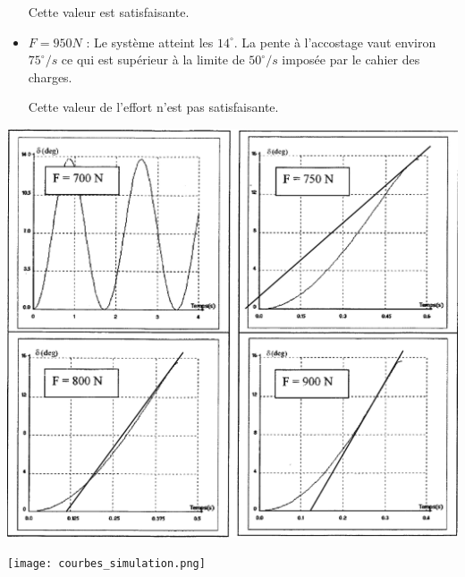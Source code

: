 \begin{multicols}{2}
\begin{corrige}
\begin{itemize}
Cette valeur est satisfaisante.

\item \textbf{$F=950N$} : Le système atteint les $14^{\circ}$. La pente à l'accostage vaut environ $75^{\circ}/s$ ce
qui est supérieur à la limite de $50^{\circ}/s$ imposée par le cahier des
charges.

Cette valeur de l'effort n'est pas satisfaisante.
\end{itemize}

\begin{center}
\includegraphics[width=1.0\textwidth]{images/courbes_simulation_corrige.png}
\end{center}



\end{corrige}
\else
\fi


\begin{center}
\texttt{[image: courbes\_simulation.png]}
\end{center}





\ifprof
\else
\end{multicols}%
\fi

